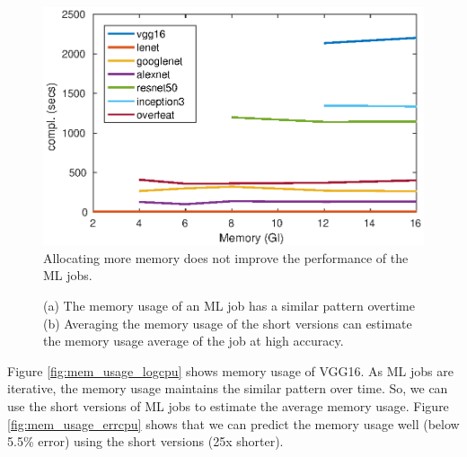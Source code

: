\begin{figure}[h]
	\centering
	\includegraphics[width=0.7\linewidth]{figs/prof-mem-64-cpu}
	\caption{Allocating more memory does not improve the performance of the ML jobs.}
	\label{fig:prof-mem-64-cpu}
\end{figure}


\begin{figure}[!h]
	\centering
	    \hspace{0.1in}
	\caption{(a) The memory usage of an ML job has a similar pattern overtime (b) Averaging the memory usage of the short versions can estimate the memory usage average of the job at high accuracy.}
	\label{fig:mem_usage}
\end{figure}

Figure \ref{fig:mem_usage_logcpu} shows memory usage of VGG16. As ML jobs are iterative, the memory usage maintains the similar pattern over time. 
So, we can use the short versions of ML jobs to estimate the average memory usage.
Figure \ref{fig:mem_usage_errcpu} shows that we can predict the memory usage well (below 5.5\% error) using the short versions (25x shorter).

